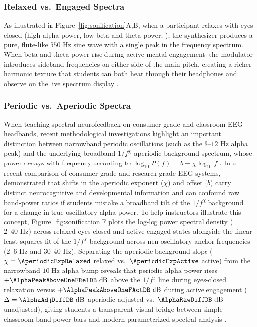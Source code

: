 \documentclass[11pt]{article}
\begin{document}
\subsubsection{Relaxed vs.\ Engaged Spectra}
As illustrated in Figure~\ref{fig:sonification}A,B, when a participant relaxes with eyes closed (high alpha power, low beta and theta power; \citealp{takabatake2021musical}), the synthesizer produces a pure, flute-like $650\text{ Hz}$ sine wave with a single peak in the frequency spectrum. When beta and theta power rise during active mental engagement, the modulator introduces sideband frequencies on either side of the main pitch, creating a richer harmonic texture that students can both hear through their headphones and observe on the live spectrum display \citep{livingstone2018ravdess,monroydcroz2026minimalist}.

\subsubsection{Periodic vs.\ Aperiodic Spectra}
When teaching spectral neurofeedback on consumer-grade and classroom EEG headbands, recent methodological investigations highlight an important distinction between narrowband periodic oscillations (such as the $8\text{--}12\text{ Hz}$ alpha peak) and the underlying broadband $1/f^{\chi}$ aperiodic background spectrum, whose power decays with frequency according to $\log_{10} P(f) = b - \chi \log_{10} f$ \citep{cannard2021validating,sabio2024scoping,vanbueren2026comparing,dekleijn2023short}. In a recent comparison of consumer-grade and research-grade EEG systems, \citet{vanbueren2026comparing} demonstrated that shifts in the aperiodic exponent ($\chi$) and offset ($b$) carry distinct neurocognitive and developmental information and can confound raw band-power ratios if students mistake a broadband tilt of the $1/f^{\chi}$ background for a change in true oscillatory alpha power. To help instructors illustrate this concept, Figure~\ref{fig:sonification}F plots the log-log power spectral density ($2\text{--}40\text{ Hz}$) across relaxed eyes-closed and active engaged states alongside the linear least-squares fit of the $1/f^{\chi}$ background across non-oscillatory anchor frequencies ($2\text{--}6\text{ Hz}$ and $30\text{--}40\text{ Hz}$). Separating the aperiodic background slope ($\chi = \AperiodicExpRelaxed$ relaxed vs.\ $\AperiodicExpActive$ active) from the narrowband $10\text{ Hz}$ alpha bump reveals that periodic alpha power rises $+\AlphaPeakAboveOneFRelDB\text{ dB}$ above the $1/f^{\chi}$ line during eyes-closed relaxation versus $+\AlphaPeakAboveOneFActDB\text{ dB}$ during active engagement ($\Delta = \AlphaAdjDiffDB\text{ dB}$ aperiodic-adjusted vs.\ $\AlphaRawDiffDB\text{ dB}$ unadjusted), giving students a transparent visual bridge between simple classroom band-power bars and modern parameterized spectral analysis \citep{cannard2021validating,vanbueren2026comparing}.
\end{document}
